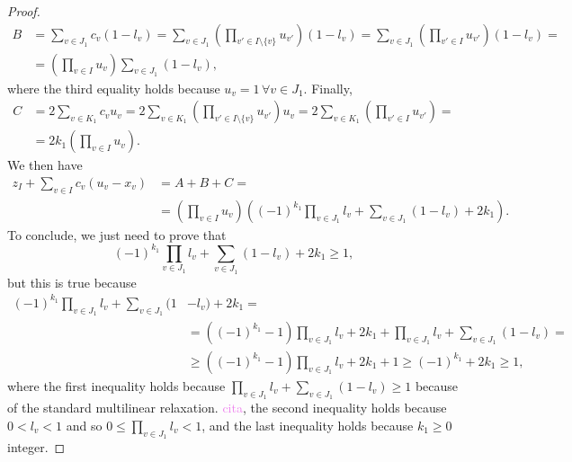 \documentclass{article}
\begin{document}
\begin{proof}
\begin{align*}
			B & = \sum_{v \in J_1} c_v(1 - l_v) = \sum_{v \in J_1} (\prod_{v' \in I \setminus \{v\}}u_{v'})(1 - l_v) =
			\sum_{v \in J_1} (\prod_{v' \in I }u_{v'})(1 - l_v) = \\
			& =(\prod_{v \in I }u_v) \sum_{v \in J_1} (1 - l_v),
		\end{align*}
		where the third equality holds because \(u_v = 1 \, \forall v \in J_1\). Finally,
		\begin{align*}
			C & = 2\sum_{v \in K_1}c_v u_v  = 2 \sum_{v \in K_1} (\prod_{v' \in I \setminus \{v\}}u_{v'})u_v =
			2 \sum_{v \in K_1} (\prod_{v' \in I }u_{v'})  = \\ 
			& = 2k_1 (\prod_{v \in I }u_v).
		\end{align*}
		We then have 
		\begin{align*}
				z_I + \sum_{v \in I} c_v (u_v - x_v) &= A+B+C = \\
				& = (\prod_{v \in I }u_v) ((-1)^{k_1} \prod_{v \in J_1} l_v + \sum_{v \in J_1} (1 - l_v) +  2k_1).
		\end{align*}
		To conclude, we just need to prove that
		\begin{equation*}
			(-1)^{k_1} \prod_{v \in J_1} l_v + \sum_{v \in J_1} (1 - l_v) +  2k_1 \geq 1,
		\end{equation*} 
		but this is true because
		\begin{align*}
			(-1)^{k_1} \prod_{v \in J_1} l_v + \sum_{v \in J_1} (1 & - l_v)  +  2k_1 = \\
			& = ((-1)^{k_1}-1) \prod_{v \in J_1} l_v + 2k_1 + \prod_{v \in J_1} l_v + \sum_{v \in J_1} (1 - l_v) =  \\
			& \geq ((-1)^{k_1}-1) \prod_{v \in J_1} l_v + 2k_1 + 1 \geq (-1)^{k_1} + 2k_1 \geq 1,
		\end{align*}
		where the first inequality holds because \(\prod_{v \in J_1} l_v + \sum_{v \in J_1} (1 - l_v) \geq 1\) because of the standard multilinear relaxation. \textcolor{violet}{cita}, the second inequality holds because \(0 < l_v < 1\) and so \(0 \leq \prod_{v \in J_1} l_v < 1\), and the last inequality holds because \(k_1 \geq 0\) integer.

\end{proof}
\end{document}
